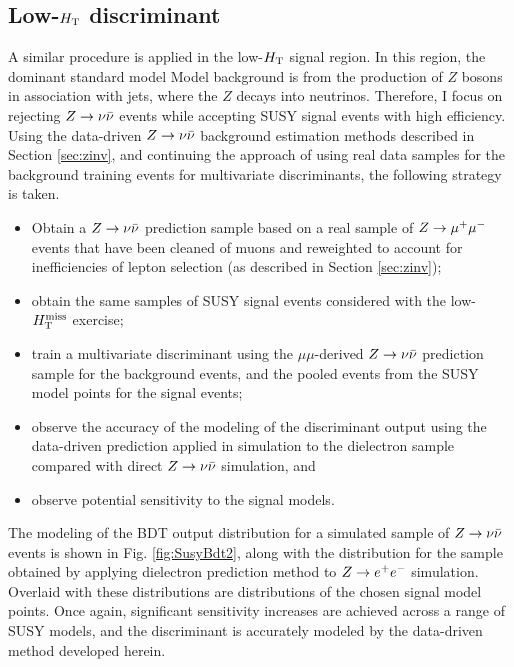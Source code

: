 \FloatBarrier
\subsection{Low-$H_{\rm T}$ discriminant}
A similar procedure is applied in the low-$H_{\rm T}$ signal region. In this region, the dominant standard model Model background is from the production of $Z$ bosons in association with jets, where the $Z$ decays into neutrinos. Therefore, I focus on rejecting $Z\rightarrow \nu\bar{\nu}$ events while accepting SUSY signal events with high efficiency. Using the data-driven $Z\rightarrow \nu\bar{\nu}$ background estimation methods described in Section \ref{sec:zinv}, and continuing the approach of using real data samples for the background training events for multivariate discriminants, the following strategy is taken.
\begin{itemize}
\item Obtain a $Z\rightarrow \nu\bar{\nu}$ prediction sample based on a real sample of $Z\rightarrow \mu^+\mu^-$ events that have been cleaned of muons and reweighted to account for inefficiencies of lepton selection (as described in Section \ref{sec:zinv});
\item obtain the same samples of SUSY signal events considered with the low-$H_{\text{T}}^{\rm miss}$ exercise;
\item train a multivariate discriminant using the $\mu\mu$-derived $Z\rightarrow \nu\bar{\nu}$ prediction sample for the background events, and the pooled events from the SUSY model points for the signal events;
\item observe the accuracy of the modeling of the discriminant output using the data-driven prediction applied in simulation to the dielectron sample compared with direct $Z\rightarrow \nu\bar{\nu}$ simulation, and
\item observe potential sensitivity to the signal models.
\end{itemize}
The modeling of the BDT output distribution for a simulated sample of $Z\rightarrow \nu\bar{\nu}$ events is shown in Fig. \ref{fig:SusyBdt2}, along with the distribution for the sample obtained by applying dielectron prediction method to $Z\rightarrow e^+e^-$ simulation. Overlaid with these distributions are distributions of the chosen signal model points. Once again, significant sensitivity increases are achieved across a range of SUSY models, and the discriminant is accurately modeled by the data-driven method developed herein. 
